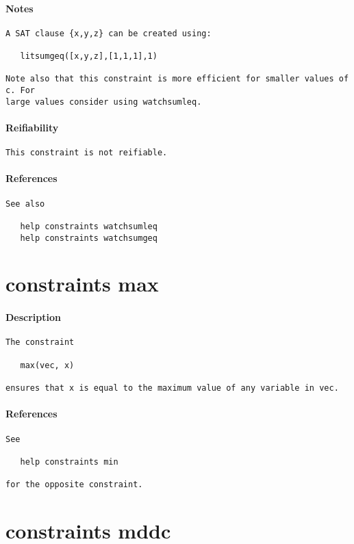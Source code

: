 \paragraph{Notes}
{\footnotesize
\begin{verbatim}
A SAT clause {x,y,z} can be created using:

   litsumgeq([x,y,z],[1,1,1],1)

Note also that this constraint is more efficient for smaller values of c. For
large values consider using watchsumleq.
\end{verbatim}
}
\paragraph{Reifiability}
{\footnotesize
\begin{verbatim}
This constraint is not reifiable.
\end{verbatim}
}
\paragraph{References}
{\footnotesize
\begin{verbatim}
See also

   help constraints watchsumleq
   help constraints watchsumgeq
\end{verbatim}
}
\section{constraints max}
\paragraph{Description}
{\footnotesize
\begin{verbatim}
The constraint

   max(vec, x)

ensures that x is equal to the maximum value of any variable in vec.
\end{verbatim}
}
\paragraph{References}
{\footnotesize
\begin{verbatim}
See

   help constraints min

for the opposite constraint.
\end{verbatim}
}
\section{constraints mddc}
